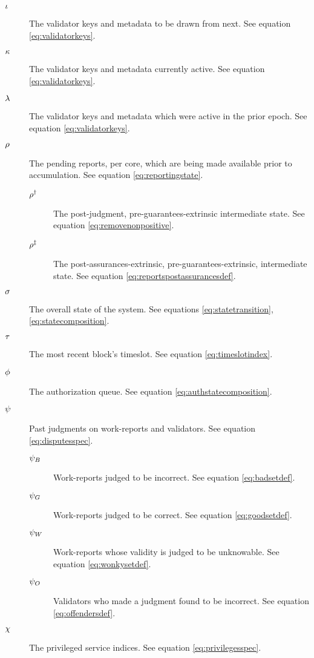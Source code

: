 \begin{description}
  \item[$\iota$] The validator keys and metadata to be drawn from next. See equation \ref{eq:validatorkeys}.
  \item[$\kappa$] The validator keys and metadata currently active. See equation \ref{eq:validatorkeys}.
  \item[$\lambda$] The validator keys and metadata which were active in the prior epoch. See equation \ref{eq:validatorkeys}.
  \item[$\rho$] The pending reports, per core, which are being made available prior to accumulation. See equation \ref{eq:reportingstate}.
  \begin{description}
    \item[$\rho^\dagger$] The post-judgment, pre-guarantees-extrinsic intermediate state. See equation \ref{eq:removenonpositive}.
    \item[$\rho^\ddagger$] The post-assurances-extrinsic, pre-guarantees-extrinsic, intermediate state. See equation \ref{eq:reportspostassurancesdef}.
  \end{description}
  \item[$\sigma$] The overall state of the system. See equations \ref{eq:statetransition}, \ref{eq:statecomposition}.
  \item[$\tau$] The most recent block's timeslot. See equation \ref{eq:timeslotindex}.
  \item[$\phi$] The authorization queue. See equation \ref{eq:authstatecomposition}.
  \item[$\psi$] Past judgments on work-reports and validators. See equation \ref{eq:disputesspec}.
  \begin{description}
    \item[$\psi_B$] Work-reports judged to be incorrect. See equation \ref{eq:badsetdef}.
    \item[$\psi_G$] Work-reports judged to be correct. See equation \ref{eq:goodsetdef}.
    \item[$\psi_W$] Work-reports whose validity is judged to be unknowable. See equation \ref{eq:wonkysetdef}.
    \item[$\psi_O$] Validators who made a judgment found to be incorrect. See equation \ref{eq:offendersdef}.
  \end{description}
  \item[$\chi$] The privileged service indices. See equation \ref{eq:privilegesspec}.
  \begin{description}

\end{description}
\end{description}
